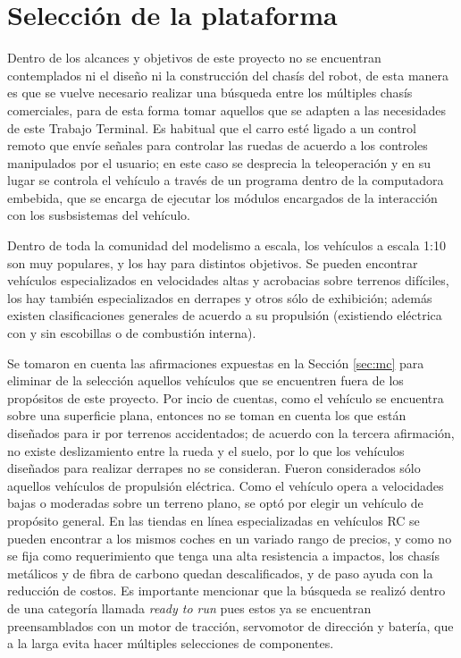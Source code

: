 \section{Selección de la plataforma}
\label{sec:selplat}
Dentro de los alcances y objetivos de este proyecto no se encuentran contemplados ni el diseño ni la construcción del chasís del robot, de esta manera es que se vuelve necesario realizar una búsqueda entre los múltiples chasís comerciales, para de esta forma tomar aquellos que se adapten a las necesidades de este Trabajo Terminal. Es habitual que el carro esté ligado a un control remoto que envíe señales para controlar las ruedas de acuerdo a los controles manipulados por el usuario; en este caso se desprecia la teleoperación y en su lugar se controla el vehículo a través de un programa dentro de la computadora embebida, que se encarga de ejecutar los módulos encargados de la interacción con los susbsistemas del vehículo.
\par Dentro de toda la comunidad del modelismo a escala, los vehículos a escala 1:10 son muy populares, y los hay para distintos objetivos. Se pueden encontrar vehículos especializados en velocidades altas y acrobacias sobre terrenos difíciles, los hay también especializados en derrapes y otros sólo de exhibición; además existen clasificaciones generales de acuerdo a su propulsión (existiendo eléctrica con y sin escobillas o de combustión interna).
\par Se tomaron en cuenta las afirmaciones expuestas en la Sección \ref{sec:mc} para eliminar de la selección aquellos vehículos que se encuentren fuera de los propósitos de este proyecto. Por incio de cuentas, como el vehículo se encuentra sobre una superficie plana, entonces no se toman en cuenta los que están diseñados para ir por terrenos accidentados; de acuerdo con la tercera afirmación, no existe deslizamiento entre la rueda y el suelo, por lo que los vehículos diseñados para realizar derrapes no se consideran. Fueron considerados sólo aquellos vehículos de propulsión eléctrica. Como el vehículo opera a velocidades bajas o moderadas sobre un terreno plano, se optó por elegir un vehículo de propósito general. En las tiendas en línea especializadas en vehículos RC se pueden encontrar a los mismos coches en un variado rango de precios, y como no se fija como requerimiento que tenga una alta resistencia a impactos, los chasís metálicos y de fibra de carbono quedan descalificados, y de paso ayuda con la reducción de costos. Es importante mencionar que la búsqueda se realizó dentro de una categoría llamada {\it ready to run} pues estos ya se encuentran preensamblados con un motor de tracción, servomotor de dirección y batería, que a la larga evita hacer múltiples selecciones de componentes.
